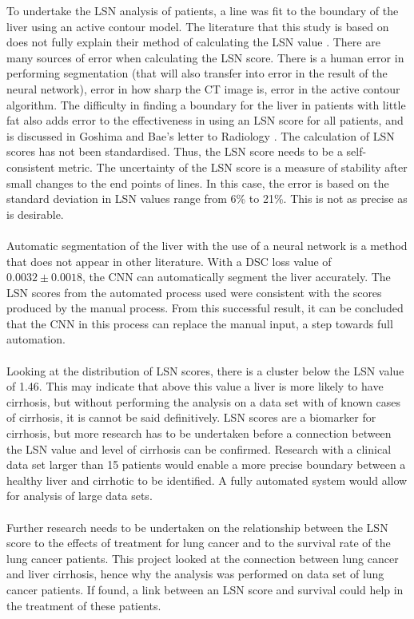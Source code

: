 \documentclass[12pt]{article}
\begin{document}
To undertake the LSN analysis of patients, a line was fit to the boundary of the liver using an active contour model. The literature that this study is based on does not fully explain their method of calculating the LSN value \cite{Sartoris:2018aa}. There are many sources of error when calculating the LSN score. There is a human error in performing segmentation (that will also transfer into error in the result of the neural network), error in how sharp the CT image is, error in the active contour algorithm. The difficulty in finding a boundary for the liver in patients with little fat also adds error to the effectiveness in using an LSN score for all patients, and is discussed in Goshima and Bae's letter to Radiology \cite{Goshima:2017aa}. The calculation of LSN scores has not been standardised. Thus, the LSN score needs to be a self-consistent metric. The uncertainty of the LSN score is a measure of stability after small changes to the end points of lines. In this case, the error is based on the standard deviation in LSN values range from 6\% to 21\%. This is not as precise as is desirable. 
\\ \\
Automatic segmentation of the liver with the use of a neural network is a method that does not appear in other literature. With a DSC loss value of \hbox{$0.0032\pm0.0018$}, the CNN can automatically segment the liver accurately. The LSN scores from the automated process used were consistent with the scores produced by the manual process. From this successful result, it can be concluded that the CNN in this process can replace the manual input, a step towards full automation. 
\\ \\
Looking at the distribution of LSN scores, there is a cluster below the LSN value of 1.46. This may indicate that above this value a liver is more likely to have cirrhosis, but without performing the analysis on a data set with of known cases of cirrhosis, it is cannot be said definitively. LSN scores are a biomarker for cirrhosis, but more research has to be undertaken before a connection between the LSN value and level of cirrhosis can be confirmed. Research with a clinical data set larger than 15 patients would enable a more precise boundary between a healthy liver and cirrhotic to be identified. A fully automated system would allow for analysis of large data sets.
\\ \\
Further research needs to be undertaken on the relationship between the LSN score to the effects of treatment for lung cancer and to the survival rate of the lung cancer patients. This project looked at the connection between lung cancer and liver cirrhosis, hence why the analysis was performed on data set of lung cancer patients. If found, a link between an LSN score and survival could help in the treatment of these patients. 
\end{document}
